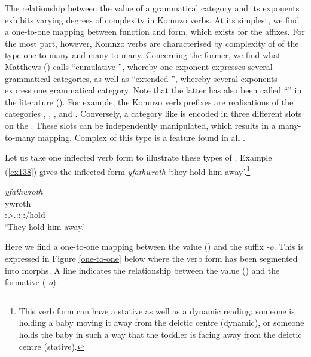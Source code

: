 The relationship between the value of a grammatical category and its exponents exhibits varying degrees of complexity in Komnzo verbs. At its simplest, we find a one-to-one mapping between function and form, which exists for the  affixes. For the most part, however, Komnzo verbs are characterised by complexity of  of the type one-to-many and many-to-many. Concerning the former, we find what Matthews (\citeyear[147-149]{Matthews:1979vm}) calls ``cumulative '', whereby one exponent expresses several grammatical categories, as well as ``extended '', whereby several exponents express one grammatical category. Note that the latter has also been called ``'' in the literature (\citealt[163]{Caballero:2012vr}). For example, the Komnzo verb prefixes are  realisations of the categories , , ,  and . Conversely, a category like  is encoded in three different slots on the . These slots can be independently manipulated, which results in a many-to-many mapping. Complex  of this type is a feature found in all .%

Let us take one inflected verb form to illustrate these types of . Example (\ref{ex138}) gives the inflected  form \emph{yfathwroth} `they hold him away'.\footnote{This verb form can have a stative as well as a dynamic reading: someone is holding a baby moving it away from the deictic centre (dynamic), or someone holds the baby in such a way that the toddler is facing away from the deictic centre (stative).}

\begin{exe}
	\ex \emph{yfathwroth}\\
	\gll ywroth\\
	\Stpl:\Sbj>\Tsg.\Masc:\Obj:\Nonpast:\Ipfv:\Andat/hold\\
	\trans `They hold him away.'
	\label{ex138}
\end{exe}

Here we find a one-to-one mapping between the  value () and the suffix \emph{-o}. This is expressed in Figure \ref{one-to-one} below where the verb form has been segmented into morphs. A line indicates the  relationship between the value (\Andat) and the formative (\emph{-o}).

